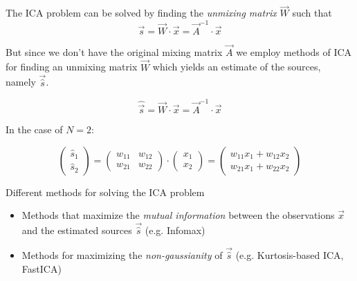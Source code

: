 \begin{frame}{\secname}

The ICA problem can be solved by finding the \emph{unmixing matrix} $\vec W$ such that 
\begin{equation}
\vec s = \vec W \cdot \vec x = \vec A^{-1} \cdot \vec x
\end{equation}

But since we don't have the original mixing matrix $\vec A$ we employ methods of ICA for finding an unmixing matrix $\vec W$ which yields an estimate of the sources, namely $\vec {\hat s}$. 

\begin{equation}
\hat{\vec s} = \vec W \cdot \vec x = \vec A^{-1} \cdot \vec x
\end{equation}

In the case of $N=2$:

\begin{equation}
 \left( \begin{array}{ll}
			\hat s_1 \\ \hat s_2
		\end{array} \right)
        = \left( \begin{array}{ll}
			w_{11} & w_{12} \\ w_{21} & w_{22}
		\end{array} \right) \cdot \left( \begin{array}{ll}
			x_1 \\ x_2
		\end{array} \right)
	= \left( \begin{array}{l}
		w_{11} x_1 + w_{12} x_2 \\ w_{21} x_1 + w_{22} x_2
	\end{array} \right)
\end{equation}

\end{frame}

\begin{frame}{Different methods for solving the ICA problem}


\begin{itemize}
\item Methods that maximize the \emph{mutual information} between the observations $\vec x$ and the estimated sources $\vec {\hat s}$ (e.g. Infomax)
\item Methods for maximizing the \emph{non-gaussianity} of $\vec {\hat s}$ (e.g. Kurtosis-based ICA, FastICA)
\end{itemize}

\end{frame}

